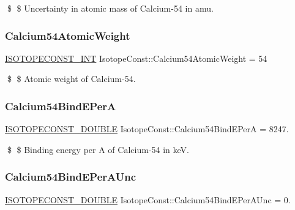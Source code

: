 \$ \$ Uncertainty in atomic mass of Calcium-\/54 in amu. \mbox{\label{group___isotope_const-_calcium-_ca54_ga18deec27160ff7e917ba364cba551a07}} 
\subsubsection{\texorpdfstring{Calcium54\+Atomic\+Weight}{Calcium54AtomicWeight}}
{\footnotesize\ttfamily \mbox{\hyperlink{group___isotope_const-_macros_ga5f18360b3e99483a35c32d789e62621c}{I\+S\+O\+T\+O\+P\+E\+C\+O\+N\+S\+T\+\_\+\+I\+NT}} Isotope\+Const\+::\+Calcium54\+Atomic\+Weight = 54}

\$ \$ Atomic weight of Calcium-\/54. \mbox{\label{group___isotope_const-_calcium-_ca54_ga00416920e79d241c1a3915a658d3e791}} 
\subsubsection{\texorpdfstring{Calcium54\+Bind\+E\+PerA}{Calcium54BindEPerA}}
{\footnotesize\ttfamily \mbox{\hyperlink{group___isotope_const-_macros_ga8f45a7272ce02c0b4c65c44636ed719a}{I\+S\+O\+T\+O\+P\+E\+C\+O\+N\+S\+T\+\_\+\+D\+O\+U\+B\+LE}} Isotope\+Const\+::\+Calcium54\+Bind\+E\+PerA = 8247.}

\$ \$ Binding energy per A of Calcium-\/54 in keV. \mbox{\label{group___isotope_const-_calcium-_ca54_ga813ebf9423d3518bb87b46b3357eeb33}} 
\subsubsection{\texorpdfstring{Calcium54\+Bind\+E\+Per\+A\+Unc}{Calcium54BindEPerAUnc}}
{\footnotesize\ttfamily \mbox{\hyperlink{group___isotope_const-_macros_ga8f45a7272ce02c0b4c65c44636ed719a}{I\+S\+O\+T\+O\+P\+E\+C\+O\+N\+S\+T\+\_\+\+D\+O\+U\+B\+LE}} Isotope\+Const\+::\+Calcium54\+Bind\+E\+Per\+A\+Unc = 0.}

